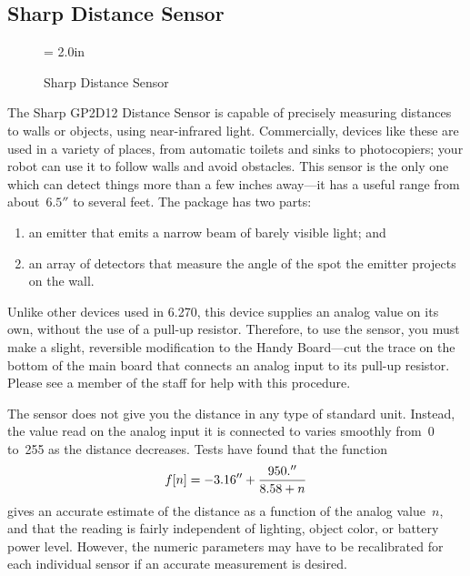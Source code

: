 \subsection{Sharp Distance Sensor}

\begin{figure}[htbp]
 \centerline{\epsfysize = 2.0in}
 \caption{Sharp Distance Sensor}
 \label{distance}
\end{figure}

The Sharp GP2D12 Distance Sensor is capable of precisely measuring
distances to walls or objects, using near-infrared light.
Commercially, devices like these are used in a variety of places, from
automatic toilets and sinks to photocopiers; your robot can use it to
follow walls and avoid obstacles. This sensor is the only one which can detect things more than a few inches away---it has a useful range from about~$6.5''$ to several feet.
The package has two parts:

\begin{enumerate}
\item an emitter that emits a narrow beam of barely visible light; and
\item an array of detectors that measure the angle of the spot the
      emitter projects on the wall.
\end{enumerate}

Unlike other devices used in 6.270, this device supplies an analog
value on its own, without the use of a pull-up resistor.  Therefore,
to use the sensor, you must make a slight, reversible modification to
the Handy Board---cut the trace on the bottom of the main board that
connects an analog input to its pull-up resistor.  Please see a member
of the staff for help with this procedure.

The sensor does not give you the distance in any type of standard
unit.  Instead, the value read on the analog input it is connected to
varies smoothly from~0 to~255 as the distance decreases.  Tests have
found that the function
$$ f[n] = -3.16'' + { 950.'' \over 8.58+n } $$
gives an accurate estimate of the distance as a function of the analog
value~$n$, and that the reading is fairly independent of lighting,
object color, or battery power level.  However, the numeric parameters
may have to be recalibrated for each individual sensor if an accurate
measurement is desired.
